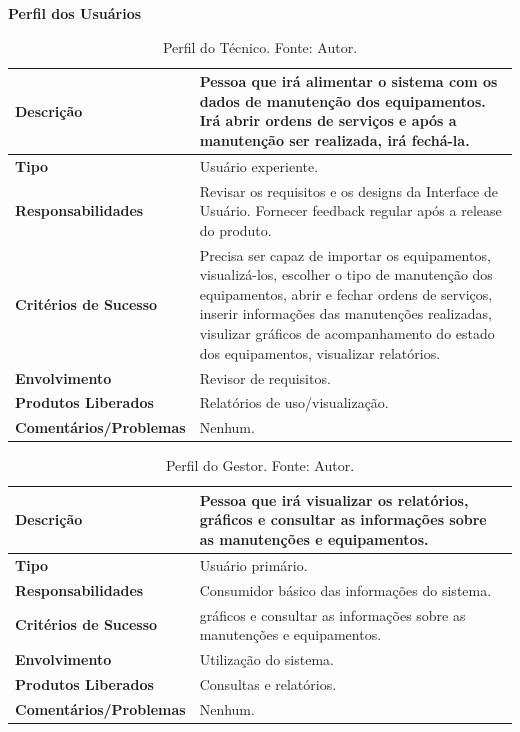\pagebreak

\textbf{Perfil dos Usuários}

\begin{table}[H]
\centering
\caption{Perfil do Técnico. Fonte: Autor.}
\label{tab-perfil-tec}
\begin{tabular}{ | p{5cm} | p{10cm} | }
\hline
	\textbf{Descrição} & Pessoa que irá alimentar o sistema com os dados de manutenção dos equipamentos. Irá abrir ordens de serviços e após a manutenção ser realizada, irá fechá-la.  \\ \hline
	\textbf{Tipo} & Usuário experiente. \\ \hline
	\textbf{Responsabilidades} &  Revisar os requisitos e os designs da Interface de Usuário. Fornecer feedback regular após a release do produto. \\ \hline
	\textbf{Critérios de Sucesso} & Precisa ser capaz de importar os equipamentos, visualizá-los, escolher o tipo de manutenção dos equipamentos, abrir e fechar ordens de serviços, inserir informações das manutenções realizadas, visulizar gráficos de acompanhamento do estado dos equipamentos, visualizar relatórios. \\ \hline
	\textbf{Envolvimento} & Revisor de requisitos. \\ \hline
	\textbf{Produtos Liberados} & Relatórios de uso/visualização. \\ \hline
	\textbf{Comentários/Problemas} & Nenhum. \\ \hline
\end{tabular}
\end{table}

\begin{table}[H]
\centering
\caption{Perfil do Gestor. Fonte: Autor.}
\label{tab-perfil-gestor}
\begin{tabular}{ | p{5cm} | p{10cm} | }
\hline
	\textbf{Descrição} & Pessoa que irá visualizar os relatórios, gráficos e consultar as informações sobre as manutenções e equipamentos. \\ \hline
	\textbf{Tipo} & Usuário primário. \\ \hline
	\textbf{Responsabilidades} & Consumidor básico das informações do sistema. \\ \hline
	\textbf{Critérios de Sucesso} & gráficos e consultar as informações sobre as manutenções e equipamentos. \\ \hline
	\textbf{Envolvimento} & Utilização do sistema. \\ \hline
	\textbf{Produtos Liberados} & Consultas e relatórios. \\ \hline
	\textbf{Comentários/Problemas} & Nenhum. \\ \hline
\end{tabular}
\end{table}

